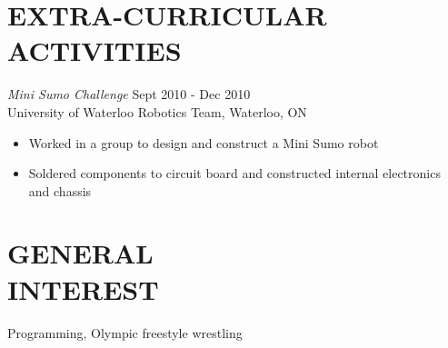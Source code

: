 \documentclass[margin]{res}
\begin{document}
\begin{resume}
	

\section{EXTRA-CURRICULAR \\ ACTIVITIES}             		
		{\it Mini Sumo Challenge}  \hfill Sept 2010 - Dec 2010\\
		University of Waterloo Robotics Team, Waterloo, ON
\begin{itemize} \itemsep -2pt
		\item Worked in a group to design and construct a Mini Sumo robot 
		\item Soldered components to circuit board and constructed internal electronics and chassis
		\end{itemize}

\section{GENERAL\\INTEREST}

	Programming, Olympic freestyle wrestling



\end{resume}
\end{document}
